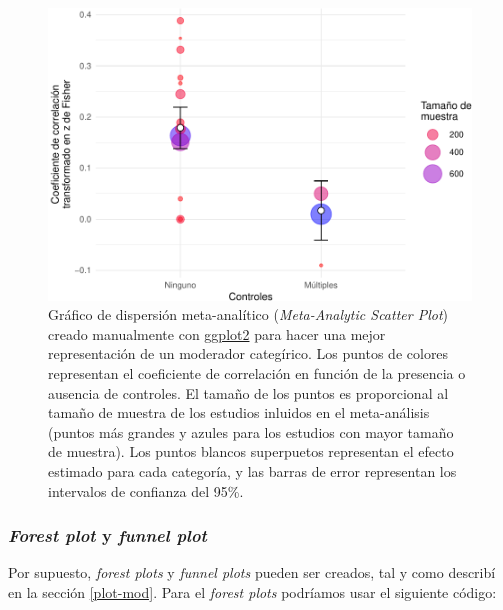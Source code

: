 \documentclass[
  bookmarksnumbered]{article}
\begin{document}
\begin{figure}
\centering
\includegraphics{Meta-analysis_files/figure-latex/reg-plot3-1.pdf}
\caption{\label{fig:reg-plot3}Gráfico de dispersión meta-analítico (\emph{Meta-Analytic Scatter Plot}) creado manualmente con \href{https://ggplot2.tidyverse.org/}{ggplot2} para hacer una mejor representación de un moderador categírico. Los puntos de colores representan el coeficiente de correlación en función de la presencia o ausencia de controles. El tamaño de los puntos es proporcional al tamaño de muestra de los estudios inluidos en el meta-análisis (puntos más grandes y azules para los estudios con mayor tamaño de muestra). Los puntos blancos superpuetos representan el efecto estimado para cada categoría, y las barras de error representan los intervalos de confianza del 95\%.}
\end{figure}

\hypertarget{plot-mod2}{%
\subsubsection{\texorpdfstring{\emph{Forest plot} y \emph{funnel plot}}{Forest plot y funnel plot}}\label{plot-mod2}}

Por supuesto, \emph{forest plots} y \emph{funnel plots} pueden ser creados, tal y como describí en la sección \ref{plot-mod}. Para el \emph{forest plots} podríamos usar el siguiente código:
\end{document}
